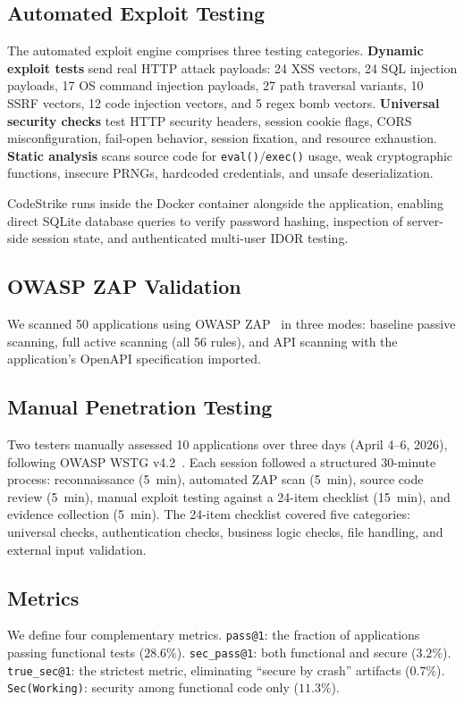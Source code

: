 \documentclass[conference,a4paper]{IEEEtran}
\begin{document}
\subsection{Automated Exploit Testing}
The automated exploit engine comprises three testing categories. \textbf{Dynamic exploit tests} send real HTTP attack payloads: 24 XSS vectors, 24 SQL injection payloads, 17 OS command injection payloads, 27 path traversal variants, 10 SSRF vectors, 12 code injection vectors, and 5 regex bomb vectors. \textbf{Universal security checks} test HTTP security headers, session cookie flags, CORS misconfiguration, fail-open behavior, session fixation, and resource exhaustion. \textbf{Static analysis} scans source code for \texttt{eval()}/\texttt{exec()} usage, weak cryptographic functions, insecure PRNGs, hardcoded credentials, and unsafe deserialization.

CodeStrike runs inside the Docker container alongside the application, enabling direct SQLite database queries to verify password hashing, inspection of server-side session state, and authenticated multi-user IDOR testing.

\subsection{OWASP ZAP Validation}
We scanned 50 applications using OWASP ZAP~\cite{zap} in three modes: baseline passive scanning, full active scanning (all 56 rules), and API scanning with the application's OpenAPI specification imported.

\subsection{Manual Penetration Testing}
Two testers manually assessed 10 applications over three days (April 4--6, 2026), following OWASP WSTG v4.2~\cite{wstg}. Each session followed a structured 30-minute process: reconnaissance (5~min), automated ZAP scan (5~min), source code review (5~min), manual exploit testing against a 24-item checklist (15~min), and evidence collection (5~min). The 24-item checklist covered five categories: universal checks, authentication checks, business logic checks, file handling, and external input validation.

\subsection{Metrics}
We define four complementary metrics. \texttt{pass@1}: the fraction of applications passing functional tests ($28.6\%$). \texttt{sec\_pass@1}: both functional and secure ($3.2\%$). \texttt{true\_sec@1}: the strictest metric, eliminating ``secure by crash'' artifacts ($0.7\%$). \texttt{Sec(Working)}: security among functional code only ($11.3\%$).
\end{document}
